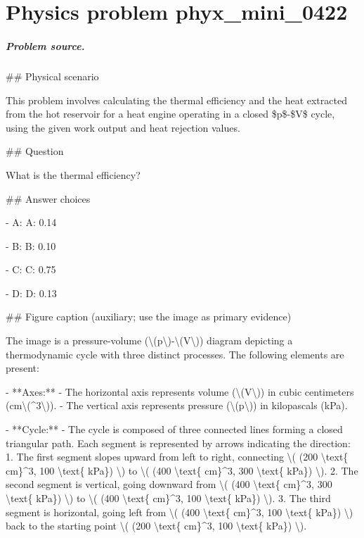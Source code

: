 
\chapter{Physics problem phyx\_mini\_0422}
\label{ch:PhyXMiniProblems_problem_phyx_mini_0422}

\paragraph{Problem source.}
\#\# Physical scenario

This problem involves calculating the thermal efficiency and the heat extracted from the hot reservoir for a heat engine operating in a closed \$p\$-\$V\$ cycle, using the given work output and heat rejection values.

\#\# Question

What is the thermal efficiency?

\#\# Answer choices

- A: A: 0.14

- B: B: 0.10

- C: C: 0.75

- D: D: 0.13

\#\# Figure caption (auxiliary; use the image as primary evidence)

The image is a pressure-volume (\textbackslash{}(p\textbackslash{})-\textbackslash{}(V\textbackslash{})) diagram depicting a thermodynamic cycle with three distinct processes. The following elements are present:

- **Axes:** 
  - The horizontal axis represents volume (\textbackslash{}(V\textbackslash{})) in cubic centimeters (cm\textbackslash{}(\textasciicircum{}3\textbackslash{})).
  - The vertical axis represents pressure (\textbackslash{}(p\textbackslash{})) in kilopascals (kPa).

- **Cycle:**
  - The cycle is composed of three connected lines forming a closed triangular path. Each segment is represented by arrows indicating the direction:
    1. The first segment slopes upward from left to right, connecting \textbackslash{}( (200 \textbackslash{}text\{ cm\}\textasciicircum{}3, 100 \textbackslash{}text\{ kPa\}) \textbackslash{}) to \textbackslash{}( (400 \textbackslash{}text\{ cm\}\textasciicircum{}3, 300 \textbackslash{}text\{ kPa\}) \textbackslash{}).
    2. The second segment is vertical, going downward from \textbackslash{}( (400 \textbackslash{}text\{ cm\}\textasciicircum{}3, 300 \textbackslash{}text\{ kPa\}) \textbackslash{}) to \textbackslash{}( (400 \textbackslash{}text\{ cm\}\textasciicircum{}3, 100 \textbackslash{}text\{ kPa\}) \textbackslash{}).
    3. The third segment is horizontal, going left from \textbackslash{}( (400 \textbackslash{}text\{ cm\}\textasciicircum{}3, 100 \textbackslash{}text\{ kPa\}) \textbackslash{}) back to the starting point \textbackslash{}( (200 \textbackslash{}text\{ cm\}\textasciicircum{}3, 100 \textbackslash{}text\{ kPa\}) \textbackslash{}).

